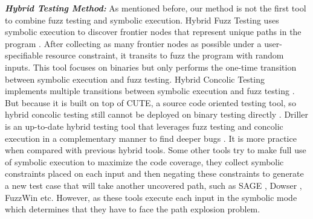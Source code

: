 \noindent\textit{\textbf{Hybrid Testing Method:}}
As mentioned before, our method is not the first tool to combine fuzz testing and symbolic execution. Hybrid Fuzz Testing uses symbolic execution to discover frontier nodes that represent unique paths in the program \cite{pak2012hybrid}. After collecting as many frontier nodes as possible under a user-specifiable resource constraint, it transits to fuzz the program with random inputs. This tool focuses on binaries but only performs the one-time transition between symbolic execution and fuzz testing. Hybrid Concolic Testing implements multiple transitions between symbolic execution and fuzz testing \cite{majumdar2007hybrid}. But because it is built on top of CUTE, a source code oriented testing tool, so hybrid concolic testing still cannot be deployed on binary testing directly \cite{sen2005cute}. Driller is an up-to-date hybrid testing tool that leverages fuzz testing and concolic execution in a complementary manner to find deeper bugs \cite{stephens2016driller}. It is more practice when compared with previous hybrid tools. Some other tools try to make full use of symbolic execution to maximize the code coverage, they collect symbolic constraints placed on each input and then negating these constraints to generate a new test case that will take another uncovered path, such as SAGE \cite{godefroid2012sage}, Dowser \cite{haller2013dowsing}, FuzzWin \cite{online:fuzzwin} etc. However, as these tools execute each input in the symbolic mode which determines that they have to face the path explosion problem. 